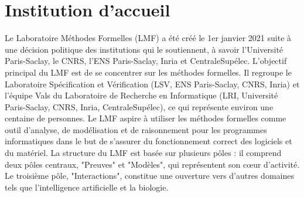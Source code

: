 \documentclass[titlepage]{article}
\begin{document}
\section{Institution d'accueil}
Le Laboratoire Méthodes Formelles (LMF) a été créé le 1er janvier 2021 suite à une décision politique des institutions qui le soutiennent, à savoir l'Université Paris-Saclay, le CNRS, l'ENS Paris-Saclay, Inria et CentraleSupélec. L'objectif principal du LMF est de se concentrer sur les méthodes formelles. Il regroupe le Laboratoire Spécification et Vérification (LSV, ENS Paris-Saclay, CNRS, Inria) et l'équipe Vals du Laboratoire de Recherche en Informatique (LRI, Université Paris-Saclay, CNRS, Inria, CentraleSupélec), ce qui représente environ une centaine de personnes.
Le LMF aspire à utiliser les méthodes formelles comme outil d'analyse, de modélisation et de raisonnement pour les programmes informatiques dans le but de s'assurer du fonctionnement correct des logiciels et du matériel.
La structure du LMF est basée sur plusieurs pôles : il comprend deux pôles centraux, "Preuves" et "Modèles", qui représentent son cœur d'activité. Le troisième pôle, "Interactions", constitue une ouverture vers d'autres domaines tels que l'intelligence artificielle et la biologie.



\end{document}

